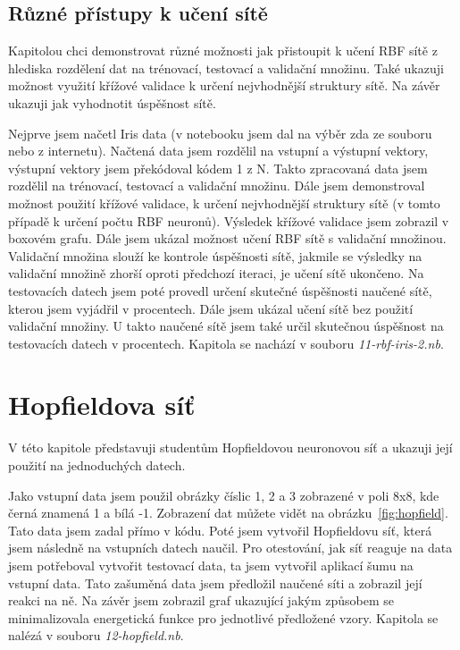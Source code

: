 \documentclass[11pt,twoside,a4paper]{book}
\begin{document}
\subsection{Různé přístupy k učení sítě}
Kapitolou chci demonstrovat různé možnosti jak přistoupit k učení RBF sítě z hlediska rozdělení dat na trénovací, testovací a validační množinu. Také ukazuji možnost využití křížové validace k určení nejvhodnější struktury sítě. Na závěr ukazuji jak vyhodnotit úspěšnost sítě.

Nejprve jsem načetl Iris data (v notebooku jsem dal na výběr zda  ze souboru nebo z internetu). Načtená data jsem rozdělil na vstupní a výstupní vektory, výstupní vektory jsem překódoval kódem 1 z N. Takto zpracovaná data jsem rozdělil na trénovací, testovací a validační množinu. Dále jsem demonstroval možnost použití křížové validace, k určení nejvhodnější struktury sítě (v tomto případě k určení počtu RBF neuronů). Výsledek křížové validace jsem zobrazil v boxovém grafu. Dále jsem ukázal možnost učení RBF sítě s validační množinou. Validační množina slouží ke kontrole úspěšnosti sítě, jakmile se výsledky na validační množině zhorší oproti předchozí iteraci, je učení sítě ukončeno. Na testovacích datech jsem poté provedl určení skutečné úspěšnosti naučené sítě, kterou jsem vyjádřil v procentech. Dále jsem ukázal učení sítě bez použití validační množiny. U takto naučené sítě jsem také určil skutečnou úspěšnost na testovacích datech v procentech. Kapitola se nachází v souboru \textit{11-rbf-iris-2.nb}.
\section{Hopfieldova síť}
V této kapitole představuji studentům Hopfieldovou neuronovou síť a ukazuji její použití na jednoduchých datech.

Jako vstupní data jsem použil obrázky číslic 1, 2 a 3 zobrazené v poli 8x8, kde černá znamená 1 a bílá -1. Zobrazení dat můžete vidět na obrázku~\ref{fig:hopfield}. Tato data jsem zadal přímo v kódu. Poté jsem vytvořil Hopfieldovu síť, která jsem následně na vstupních datech naučil. Pro otestování, jak síť reaguje na data jsem potřeboval vytvořit testovací data, ta jsem vytvořil aplikací šumu na vstupní data. Tato zašuměná data jsem předložil naučené síti a zobrazil její reakci na ně. Na závěr jsem zobrazil graf ukazující jakým způsobem se minimalizovala energetická funkce pro jednotlivé předložené vzory. Kapitola se nalézá v souboru \textit{12-hopfield.nb}.
\end{document}
